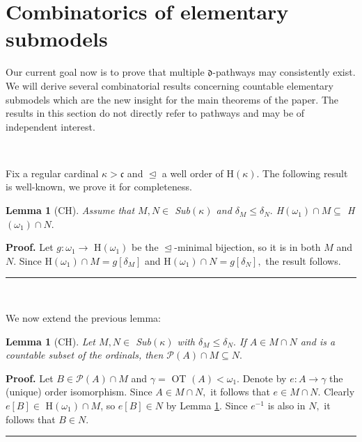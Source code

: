 \documentclass{article}%
\newtheorem{lemma}[theorem]{Lemma}
\newenvironment{proof}[1][Proof]{\noindent\textbf{#1.} }{\ \rule{0.5em}{0.5em}}
\begin{document}
\section{Combinatorics of elementary submodels \label{Seccion submodelos}}

Our current goal now is to prove that multiple $\mathfrak{d}$-pathways may
consistently exist. We will derive several combinatorial results concerning
countable elementary submodels which are the new insight for the main theorems
of the paper. The results in this section do not directly refer to pathways
and may be of independent interest.

\qquad\ \ \qquad\ \ \ 

Fix a regular cardinal $\kappa>\mathfrak{c}$ and $\trianglelefteq$ a well
order of \textsf{H}$\left(  \kappa\right)  .$ The following result is
well-known, we prove it for completeness.

\begin{lemma}
[\textsf{CH}]Assume that $M,N\in$ \textsf{Sub}$\left(  \kappa\right)  $ and
$\delta_{M}\leq\delta_{N}.$ \textsf{H}$\left(  \omega_{1}\right)  \cap
M\subseteq$ \textsf{H}$\left(  \omega_{1}\right)  \cap N.$
\label{Lema contencion Hw1}
\end{lemma}

\begin{proof}
Let $g:\omega_{1}\longrightarrow$ \textsf{H}$\left(  \omega_{1}\right)  $ be
the $\trianglelefteq$-minimal bijection, so it is in both $M$ and $N.$ Since
\textsf{H}$\left(  \omega_{1}\right)  \cap M=g\left[  \delta_{M}\right]  $ and
\textsf{H}$\left(  \omega_{1}\right)  \cap N=g\left[  \delta_{N}\right]  ,$
the result follows.
\end{proof}

\qquad\qquad\ \ 

We now extend the previous lemma:

\begin{lemma}
[\textsf{CH}]Let $M,N\in$ \textsf{Sub}$\left(  \kappa\right)  $ with
$\delta_{M}\leq\delta_{N}.$ If $A\in M\cap N$ and is a countable subset of the
ordinals, then $\mathcal{P}\left(  A\right)  \cap M\subseteq N.$
\label{Lema potencia contenida}
\end{lemma}

\begin{proof}
Let $B\in\mathcal{P}\left(  A\right)  \cap M$ and $\gamma=$ \textsf{OT}%
$\left(  A\right)  <\omega_{1}.$ Denote by $e:A\longrightarrow\gamma$ the
(unique) order isomorphism. Since $A\in M\cap N,$ it follows that $e\in M\cap
N.$ Clearly $e\left[  B\right]  \in$ \textsf{H}$\left(  \omega_{1}\right)
\cap M$, so $e\left[  B\right]  \in N$ by Lemma \ref{Lema contencion Hw1}.
Since $e^{-1}$ is also in $N,$ it follows that $B\in N.$
\end{proof}
\end{document}
